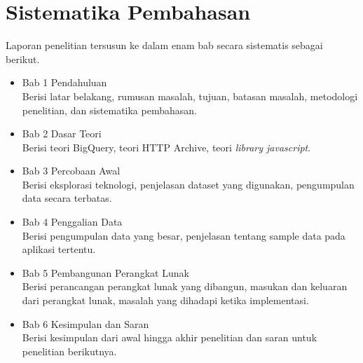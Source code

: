 \section{Sistematika Pembahasan}
\label{sec:sispem}
Laporan penelitian tersusun ke dalam enam bab secara sistematis sebagai berikut.
\begin{itemize}
    \item Bab 1 Pendahuluan\\
    Berisi latar belakang, rumusan masalah, tujuan, batasan masalah, metodologi penelitian, dan sistematika pembahasan.
   
   \item Bab 2 Dasar Teori\\
    Berisi teori BigQuery, teori HTTP Archive, teori \textit{library javascript}.
   
    \item Bab 3 Percobaan Awal\\
    Berisi eksplorasi teknologi, penjelasan dataset yang digunakan, pengumpulan data secara terbatas.
  
    \item Bab 4 Penggalian Data\\
    Berisi pengumpulan data yang besar, penjelasan tentang sample data pada aplikasi tertentu.
    
    \item Bab 5 Pembangunan Perangkat Lunak\\
Berisi perancangan perangkat lunak yang dibangun, masukan dan keluaran dari perangkat lunak, masalah yang dihadapi ketika implementasi.
   
    \item Bab 6 Kesimpulan dan Saran\\
    Berisi kesimpulan dari awal hingga akhir penelitian dan saran untuk penelitian berikutnya.
    \end{itemize}
